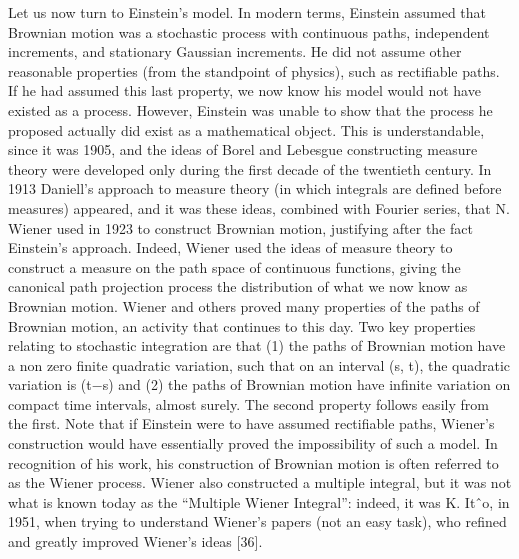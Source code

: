 \documentclass[]{tufte-handout}
\begin{document}
Let us now turn to Einstein's model. In modern terms, Einstein assumed
that Brownian motion was a stochastic process with continuous paths,
independent increments, and stationary Gaussian increments. He did not
assume other reasonable properties (from the standpoint of physics),
such as rectifiable paths. If he had assumed this last property, we now
know his model would not have existed as a process. However, Einstein
was unable to show that the process he proposed actually did exist as a
mathematical object. This is understandable, since it was 1905, and the
ideas of Borel and Lebesgue constructing measure theory were developed
only during the first decade of the twentieth century. In 1913 Daniell's
approach to measure theory (in which integrals are defined before
measures) appeared, and it was these ideas, combined with Fourier
series, that N. Wiener used in 1923 to construct Brownian motion,
justifying after the fact Einstein's approach. Indeed, Wiener used the
ideas of measure theory to construct a measure on the path space of
continuous functions, giving the canonical path projection process the
distribution of what we now know as Brownian motion. Wiener and others
proved many properties of the paths of Brownian motion, an activity that
continues to this day. Two key properties relating to stochastic
integration are that (1) the paths of Brownian motion have a non zero
finite quadratic variation, such that on an interval (s, t), the
quadratic variation is (t−s) and (2) the paths of Brownian motion have
infinite variation on compact time intervals, almost surely. The second
property follows easily from the first. Note that if Einstein were to
have assumed rectifiable paths, Wiener's construction would have
essentially proved the impossibility of such a model. In recognition of
his work, his construction of Brownian motion is often referred to as
the Wiener process. Wiener also constructed a multiple integral, but it
was not what is known today as the ``Multiple Wiener Integral'': indeed,
it was K. Itˆo, in 1951, when trying to understand Wiener's papers (not
an easy task), who refined and greatly improved Wiener's ideas {[}36{]}.
\end{document}

